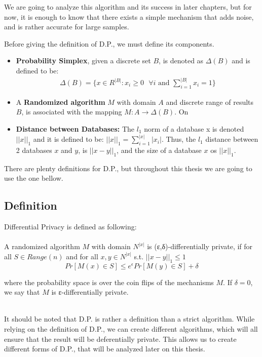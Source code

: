 We are going to analyze this algorithm and its success in later chapters, but for now, it is enough to know that there exists a simple mechanism that adds noise, and is rather accurate for large samples.

Before giving the definition of D.P., we must define its components. 

\begin{itemize}
    \item \textbf{Probability Simplex}, given a discrete set $B$, is denoted as $\Delta(B)$ and is defined to be:
    \begin{align*}
        \Delta(B) = \{ x\in R^{|B|}: x_i \geq 0 \text { } \forall i \text{ and } \sum_{i=1}^{|B|} x_i = 1\}
    \end{align*}
    \item A \textbf {Randomized algorithm} $M$ with domain $A$ and discrete range of results $B$, is associated with the mapping $M: A\rightarrow\Delta(B)$. On
    \item \textbf{Distance between Databases:} The $l_1$ norm of a database x is denoted $||x||_1$ and it is defined to be: $||x||_1 = \sum_{i = 1}^{|x|} |x_i|$. Thus, the $l_1$ distance between 2 databases $x$ and $y$, is $||x-y||_1$, and the size of a database $x$ os $||x||_1$.
    
\end{itemize}
There are plenty definitions for D.P., but throughout this thesis we are going to use the one bellow.

\subsection{Definition}
Differential Privacy is defined as following:
\\
\\
A randomized algorithm $M$ with domain $N^{|x|}$ is (ε,δ)-differentially private, if for all $S \in Range(n)$ and for all $x,y \in N^{|x|}$ s.t. $||x - y||_1 \leq 1$
$$ Pr[M(x) \in S] \leq e^\epsilon Pr[M(y) \in S] + \delta$$

where the probability space is over the coin flips of the mechanisms $M$. If $\delta = 0$, we say that $M$ is ε-differentially private.

\\
It should be noted that D.P. is rather a definition than a strict algorithm. While relying on the definition of D.P., we can create different algorithms, which will all ensure that the result will be deferentially private. This allows us to create different forms of D.P., that will be analyzed later on this thesis.

